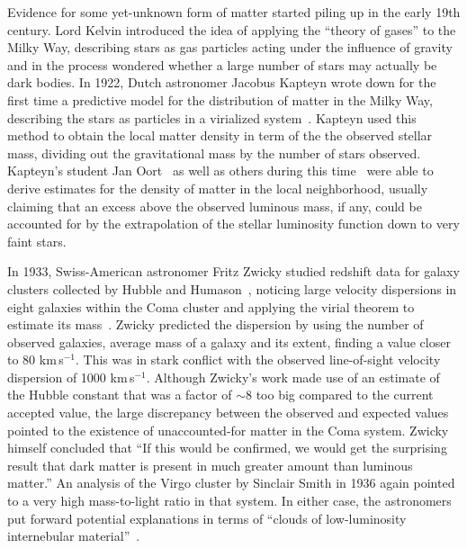 Evidence for some yet-unknown form of matter started piling up in the early 19th century. Lord Kelvin introduced the idea of applying the ``theory of gases'' to the Milky Way, describing stars as gas particles acting under the influence of gravity and in the process wondered whether a large number of stars may actually be dark bodies. In 1922, Dutch astronomer Jacobus Kapteyn wrote down for the first time a predictive model for the distribution of matter in the Milky Way, describing the stars as particles in a virialized system~\cite{1922ApJ....55..302K}. Kapteyn used this method to obtain the local matter density in term of the the observed stellar mass, dividing out the gravitational mass by the number of stars observed. Kapteyn's student Jan Oort~\cite{1932BAN.....6..249O} as well as others during this time~\cite{1922MNRAS..82..122J} were able to derive estimates for the density of matter in the local neighborhood, usually claiming that an excess above the observed luminous mass, if any, could be accounted for by the extrapolation of the stellar luminosity function down to very faint stars.

In 1933, Swiss-American astronomer Fritz Zwicky studied redshift data for galaxy clusters collected by Hubble and Humason~\cite{1931ApJ....74...43H}, noticing large velocity dispersions in eight galaxies within the Coma cluster and applying the virial theorem to estimate its mass~\cite{1933AcHPh...6..110Z}. Zwicky predicted the dispersion by using the number of observed galaxies, average mass of a galaxy and its extent, finding a value closer to 80 km\,s$^{-1}$. This was in stark conflict with the observed line-of-sight velocity dispersion of 1000 km\,s$^{-1}$. Although Zwicky's work made use of an estimate of the Hubble constant that was a factor of $\sim$8 too big compared to the current accepted value, the large discrepancy between the observed and expected values pointed to the existence of unaccounted-for matter in the Coma system. Zwicky himself concluded that ``If this would be confirmed, we would get the surprising result that dark matter is present in much greater amount than luminous matter.'' An analysis of the Virgo cluster by Sinclair Smith in 1936 again pointed to a very high mass-to-light ratio in that system. In either case, the astronomers put forward potential explanations in terms of ``clouds of low-luminosity internebular material''~\cite{1937ApJ....86..217Z}.


